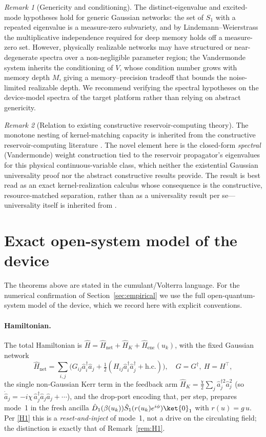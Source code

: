 \documentclass[11pt]{article}
\theoremstyle{remark}
\newtheorem{remark}{Remark}
\newcommand{\ahat}{\hat{a}}
\begin{document}
\begin{remark}[Genericity and conditioning]\label{rem:genericity}
The distinct-eigenvalue and excited-mode hypotheses hold for generic Gaussian
networks: the set of $S_1$ with a repeated eigenvalue is a measure-zero
subvariety, and by Lindemann--Weierstrass the multiplicative independence required
for deep memory holds off a measure-zero set. However, physically realizable
networks may have structured or near-degenerate spectra over a non-negligible
parameter region; the Vandermonde system inherits the conditioning of $V$, whose
condition number grows with memory depth $M$, giving a memory--precision tradeoff
that bounds the noise-limited realizable depth. We recommend verifying the
spectral hypotheses on the device-model spectra of the target platform rather than
relying on abstract genericity.
\end{remark}

\begin{remark}[Relation to existing constructive reservoir-computing theory]
The monotone nesting of kernel-matching capacity is inherited from the
constructive reservoir-computing literature \cite{boyd1985,cuchiero2021}. The
novel element here is the closed-form \emph{spectral} (Vandermonde) weight
construction tied to the reservoir propagator's eigenvalues for this physical
continuous-variable class, which neither the existential Gaussian universality
proof \cite{nokkala2021} nor the abstract constructive results provide. The
result is best read as an exact kernel-realization calculus whose consequence is
the constructive, resource-matched separation, rather than as a universality
result per se---universality itself is inherited from \cite{nokkala2021}.
\end{remark}

\section{Exact open-system model of the device}
\label{sec:model}

The theorems above are stated in the cumulant/Volterra language. For the
numerical confirmation of Section~\ref{sec:empirical} we use the full
open-quantum-system model of the device, which we record here with explicit
conventions.

\paragraph{Hamiltonian.}
The total Hamiltonian is
$\hat H = \hat H_{\mathrm{net}}+\hat H_K+\hat H_{\mathrm{enc}}(u_k)$, with the
fixed Gaussian network
\[
\hat H_{\mathrm{net}}=\sum_{i,j}\Big(G_{ij}\ahat_i^\dagger\ahat_j
+\tfrac12(H_{ij}\ahat_i^\dagger\ahat_j^\dagger+\mathrm{h.c.})\Big),
\quad G=G^\dagger,\ H=H^\top,
\]
the single non-Gaussian Kerr term in the feedback arm
$\hat H_K=\tfrac{\chi}{2}\sum_j\ahat_j^{\dagger2}\ahat_j^2$
(so $\dot{\ahat}_j=-i\chi\,\ahat_j^\dagger\ahat_j\ahat_j+\cdots$), and the
drop-port encoding that, per step, prepares mode~1 in the fresh ancilla
$\hat D_1(\beta(u_k))\hat S_1(r(u_k)e^{i\phi})\ket{0}_1$ with $r(u)=g\,u$. Per
\ref{H1} this is a \emph{reset-and-inject} of mode~1, not a drive on the
circulating field; the distinction is exactly that of Remark~\ref{rem:H1}.
\end{document}
